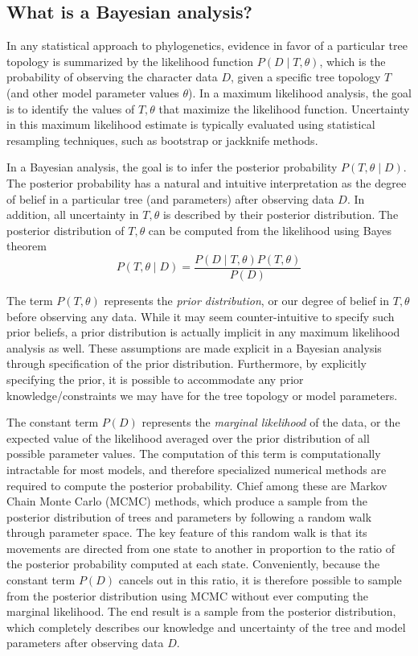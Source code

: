 \documentclass[]{article}
\begin{document}
	\subsection{What is a Bayesian analysis?}
	In any statistical approach to phylogenetics, evidence in favor of a particular tree topology is summarized by the likelihood function $P(D\mid T,\theta)$, which is the probability of observing the character data $D$, given a specific tree topology $T$ (and other model parameter values $\theta$).
	In a maximum likelihood analysis, the goal is to identify the values of $T,\theta$ that maximize the likelihood function.
	Uncertainty in this maximum likelihood estimate is typically evaluated using statistical resampling techniques, such as bootstrap or jackknife methods.
	
	In a Bayesian analysis, the goal is to infer the posterior probability $P(T,\theta\mid D)$.
	The posterior probability has a natural and intuitive interpretation as the degree of belief in a particular tree (and parameters) after observing data $D$.
	In addition, all uncertainty in $T,\theta$ is described by their posterior distribution.
	The posterior distribution of $T,\theta$ can be computed from the likelihood using Bayes theorem $$P(T,\theta\mid D) = \frac{P(D\mid T,\theta)P(T,\theta)}{P(D)}$$
	
	The term $P(T,\theta)$ represents the \emph{prior distribution}, or our degree of belief in $T,\theta$ before observing any data.
	While it may seem counter-intuitive to specify such prior beliefs, a prior distribution is actually implicit in any maximum likelihood analysis as well.
	These assumptions are made explicit in a Bayesian analysis through specification of the prior distribution.
	Furthermore, by explicitly specifying the prior, it is possible to accommodate any prior knowledge/constraints we may have for the tree topology or model parameters.
	
	The constant term $P(D)$ represents the \emph{marginal likelihood} of the data, or the expected value of the likelihood averaged over the prior distribution of all possible parameter values.
	The computation of this term is computationally intractable for most models, and therefore specialized numerical methods are required to compute the posterior probability.
	Chief among these are Markov Chain Monte Carlo (MCMC) methods, which produce a sample from the posterior distribution of trees and parameters by following a random walk through parameter space.
	The key feature of this random walk is that its movements are directed from one state to another in proportion to the ratio of the posterior probability computed at each state.
	Conveniently, because the constant term $P(D)$ cancels out in this ratio, it is therefore possible to sample from the posterior distribution using MCMC without ever computing the marginal likelihood.
	The end result is a sample from the posterior distribution, which completely describes our knowledge and uncertainty of the tree and model parameters after observing data $D$.
	
\end{document}

